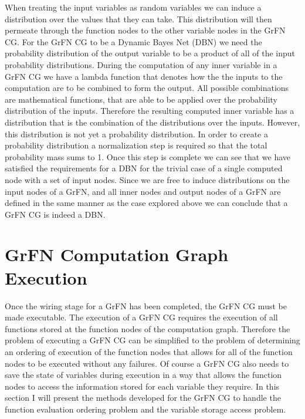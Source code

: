 When treating the input variables as random variables we can induce a distribution over the values that they can take.
This distribution will then permeate through the function nodes to the other variable nodes in the GrFN CG.
For the GrFN CG to be a Dynamic Bayes Net (DBN) we need the probability distribution of the output variable to be a product of all of the input probability distributions.
During the computation of any inner variable in a GrFN CG we have a lambda function that denotes how the the inputs to the computation are to be combined to form the output.
All possible combinations are mathematical functions, that are able to be applied over the probability distribution of the inputs.
Therefore the resulting computed inner variable has a distribution that is the combination of the distributions over the inputs.
However, this distribution is not yet a probability distribution.
In order to create a probability distribution a normalization step is required so that the total probability mass sums to 1.
Once this step is complete we can see that we have satisfied the requirements for a DBN for the trivial case of a single computed node with a set of input nodes.
Since we are free to induce distributions on the input nodes of a GrFN, and all inner nodes and output nodes of a GrFN are defined in the same manner as the case explored above we can conclude that a GrFN CG is indeed a DBN.

\section{GrFN Computation Graph Execution\label{sec:cg_execution}}
Once the wiring stage for a GrFN has been completed, the GrFN CG must be made executable. The execution of a GrFN CG requires the execution of all functions stored at the function nodes of the computation graph. Therefore the problem of executing a GrFN CG can be simplified to the problem of determining an ordering of execution of the function nodes that allows for all of the function nodes to be executed without any failures. Of course a GrFN CG also needs to save the state of variables during execution in a way that allows the function nodes to access the information stored for each variable they require. In this section I will present the methods developed for the GrFN CG to handle the function evaluation ordering problem and the variable storage access problem.

